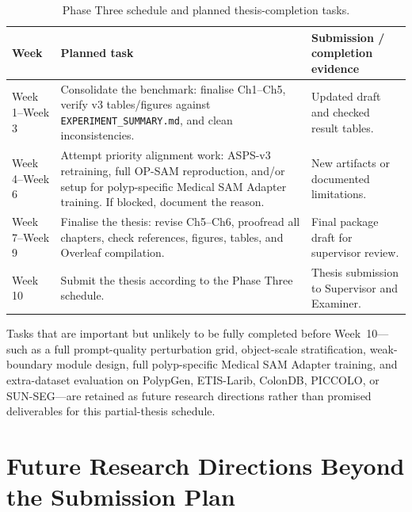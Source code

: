 \begin{table}[H]
\centering
\caption{Phase Three schedule and planned thesis-completion tasks.}
\label{tab:future-work-plan}
\begin{tabular}{p{2.4cm}p{6.0cm}p{5.0cm}}
\toprule
\textbf{Week} & \textbf{Planned task} & \textbf{Submission / completion evidence} \\
\midrule
Week 1--Week 3 & Consolidate the benchmark: finalise Ch1--Ch5, verify v3 tables/figures against \texttt{EXPERIMENT\_SUMMARY.md}, and clean inconsistencies. & Updated draft and checked result tables. \\
Week 4--Week 6 & Attempt priority alignment work: ASPS-v3 retraining, full OP-SAM reproduction, and/or setup for polyp-specific Medical SAM Adapter training. If blocked, document the reason. & New artifacts or documented limitations. \\
Week 7--Week 9 & Finalise the thesis: revise Ch5--Ch6, proofread all chapters, check references, figures, tables, and Overleaf compilation. & Final package draft for supervisor review. \\
Week 10 & Submit the thesis according to the Phase Three schedule. & Thesis submission to Supervisor and Examiner. \\
\bottomrule
\end{tabular}
\end{table}

Tasks that are important but unlikely to be fully completed before Week~10---such as a full prompt-quality perturbation grid, object-scale stratification, weak-boundary module design, full polyp-specific Medical SAM Adapter training, and extra-dataset evaluation on PolypGen, ETIS-Larib, ColonDB, PICCOLO, or SUN-SEG---are retained as future research directions rather than promised deliverables for this partial-thesis schedule.

\section{Future Research Directions Beyond the Submission Plan}
\label{sec:future-research-directions}

